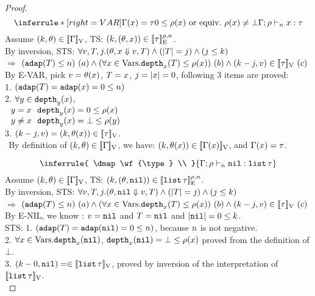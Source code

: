 \documentclass[a4paper,11pt]{article}
\theoremstyle{definition}
\begin{document}
\begin{proof}
\[    
	\inferrule*[right = VAR]{
      \Gamma(x) = \type \\ 0 \leq \dmap(x) \mbox{ or equiv.\ } \dmap(x) \neq \bot
    }{
      \Gamma; \dmap \tvdash{\nnatA} x: \type
    }
\]
Assume $(k, \theta) \in [\![ \Gamma ]\!]_{\text{V}}$, TS: $(k, (\theta, x)) \in [\![ \tau ]\!]_{\text{E}}^{\rho, n}$.\\
%
By inversion, STS: $\forall v, T, j. (\theta, x \mathrel{\Downarrow} v, T) \land (|T| = j) \land (j \leq k) $\\
$\Rightarrow$ 
$ (\mathtt{adap}(T) \leq n) ~ (a) 
\land (\forall x \in \mbox{Vars}. \mathtt{depth}_{x}(T) \leq \rho(x)) ~ (b)
\land (k - j, v) \in [\![ \tau ]\!]_{\text{V}} ~ (c)$\\
%
By E-VAR, pick $v = \theta(x)$, $T = x$, $j = |x| = 0$, following 3 items are proved:\\
%
1. $(\mathtt{adap}(T) = \mathtt{adap}(x) = 0 \leq n)$\\
2. $\forall y \in \mathtt{depth}_{y}(x)$, \\
$~~ y = x ~~ \mathtt{depth}_{y}(x) = 0 \leq \rho(x)$\\
$~~ y \neq x ~~ \mathtt{depth}_{y}(x) = \bot \leq \rho(y)$\\
3. $(k - j, v) = (k, \theta(x)) \in [\![ \tau ]\!]_{\text{V}}$.\\
$~~$By definition of $(k, \theta) \in [\![ \Gamma ]\!]_{\text{V}}$, we have: $(k, \theta(x))\in [\![ \Gamma(x) ]\!]_{\text{V}}$, and $\Gamma(x) = \tau$. 


\[    
 \inferrule{
     \dmap \wf{\type} \\
    }{
      \Gamma; \dmap \tvdash{\nnatA} \enil: \tlist{\type}
    }
\]
Assume $(k, \theta) \in [\![ \Gamma ]\!]_{\text{V}}$, TS: $(k, (\theta, \mathtt{nil})) \in [\![ \mathtt{list} \, \tau ]\!]_{\text{E}}^{\rho, n}$.\\
%
By inversion, STS: $\forall v, T, j. (\theta, \mathtt{nil} \mathrel{\Downarrow} v, T) \land (|T| = j) \land (j \leq k) $\\
$\Rightarrow$ 
$ (\mathtt{adap}(T) \leq n) ~ (a) 
\land (\forall x \in \mbox{Vars}. \mathtt{depth}_{x}(T) \leq \rho(x)) ~ (b)
\land (k - j, v) \in [\![ \tau ]\!]_{\text{V}} ~ (c)$\\
%
By E-NIL, we know : $ v = \mathtt{nil} $ and $ T = \mathtt{nil}$ and $
|\mathtt{nil}| = 0 \leq k$. \\
STS: 
%
1. $(\mathtt{adap}(T) = \mathtt{adap}(\mathtt{nil}) = 0 \leq n)$, because $n$ is
not negative.\\
2. $\forall x \in \mbox{Vars}. \mathtt{depth}_{x}(\mathtt{nil})$, $  \mathtt{depth}_{x}(\mathtt{nil}) = \bot \leq
\rho(x)$ proved from the definition of $\bot$. \\
3. $(k - 0, \mathtt{nil}) =  \in [\![  \mathtt{list} \,  \tau  ]\!]_{\text{V}}$, proved by
inversion of the interpretation of $[\![  \mathtt{list} \,  \tau  ]\!]_{\text{V}} $.\\


\end{proof}
\end{document}
